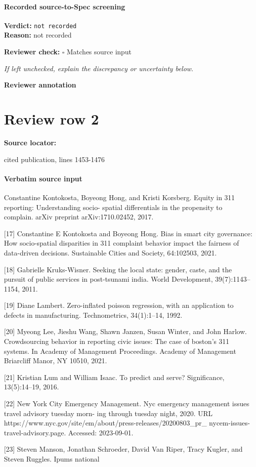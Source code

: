 \documentclass[10pt]{article}
\newcommand{\reviewerbox}{%
  \par\noindent\fbox{\parbox{0.96\linewidth}{\rule{0pt}{0.38in}}}\par
}
\newcommand{\reviewmatch}[1]{%
  \par\noindent\textbf{Reviewer check:} $\square$\; #1\par
  \noindent\emph{If left unchecked, explain the discrepancy or uncertainty below.}\par
}
\begin{document}
\paragraph{Recorded source-to-Spec screening}
\textbf{Verdict:} \texttt{not recorded}
\\
\textbf{Reason:} not recorded
\reviewmatch{Matches source input}
\noindent\textbf{Reviewer annotation}\par
\reviewerbox
\clearpage
\hypertarget{source-claim-97a62a4ba1c8a098}{}
\section*{Review row 2}
\textbf{Source locator:} {\footnotesize\raggedright cited publication, lines 1453-\allowbreak{}1476\par}
\paragraph{Verbatim source input}
\begin{ReviewVerbatim}
[16] Constantine Kontokosta, Boyeong Hong, and Kristi Korsberg. Equity in 311 reporting: Understanding socio-
spatial differentials in the propensity to complain. arXiv preprint arXiv:1710.02452, 2017.

[17] Constantine E Kontokosta and Boyeong Hong. Bias in smart city governance: How socio-spatial disparities in
311 complaint behavior impact the fairness of data-driven decisions. Sustainable Cities and Society, 64:102503,
2021.

[18] Gabrielle Kruks-Wisner. Seeking the local state: gender, caste, and the pursuit of public services in post-tsunami
india. World Development, 39(7):1143–1154, 2011.

[19] Diane Lambert. Zero-inflated poisson regression, with an application to defects in manufacturing. Technometrics,
34(1):1–14, 1992.

[20] Myeong Lee, Jieshu Wang, Shawn Janzen, Susan Winter, and John Harlow. Crowdsourcing behavior in reporting
civic issues: The case of boston’s 311 systems. In Academy of Management Proceedings. Academy of Management
Briarcliff Manor, NY 10510, 2021.

[21] Kristian Lum and William Isaac. To predict and serve? Significance, 13(5):14–19, 2016.

[22] New York City Emergency Management. Nyc emergency management issues travel advisory tuesday morn-
ing through tuesday night, 2020. URL https://www.nyc.gov/site/em/about/press-releases/20200803_pr_
nycem-issues-travel-advisory.page. Accessed: 2023-09-01.

[23] Steven Manson, Jonathan Schroeder, David Van Riper, Tracy Kugler, and Steven Ruggles. Ipums national
\end{ReviewVerbatim}
\end{document}
